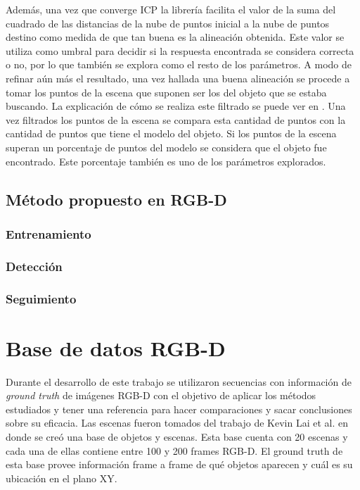 Además, una vez que converge ICP la librería facilita el valor de la suma del cuadrado de las distancias de la nube de puntos inicial a la nube de puntos destino como medida de que tan buena es la alineación obtenida. Este valor se utiliza como umbral para decidir si la respuesta encontrada se considera correcta o no, por lo que también se explora como el resto de los parámetros. A modo de refinar aún más el resultado, una vez hallada una buena alineación se procede a tomar los puntos de la escena que suponen ser los del objeto que se estaba buscando. La explicación de cómo se realiza este filtrado se puede ver en . Una vez filtrados los puntos de la escena se compara esta cantidad de puntos con la cantidad de puntos que tiene el modelo del objeto. Si los puntos de la escena superan un porcentaje de puntos del modelo se considera que el objeto fue encontrado. Este porcentaje también es uno de los parámetros explorados.


\section{Método propuesto en RGB-D}\label{metodo_rgbd}

\subsection{Entrenamiento}

\subsection{Detección}

\subsection{Seguimiento}\label{tracking_rgbd}










\chapter{Base de datos RGB-D}\label{base_rgbd}
Durante el desarrollo de este trabajo se utilizaron secuencias con información de \textit{ground truth} de imágenes RGB-D con el objetivo de aplicar los métodos estudiados y tener una referencia para hacer comparaciones y sacar conclusiones sobre su eficacia. Las escenas fueron tomados del trabajo de Kevin Lai et al. \cite{lai2011large} en donde se creó una base de objetos y escenas. Esta base cuenta con 20 escenas y cada una de ellas contiene entre 100 y 200 frames RGB-D. El ground truth de esta base provee información frame a frame de qué objetos aparecen y cuál es su ubicación en el plano XY.


